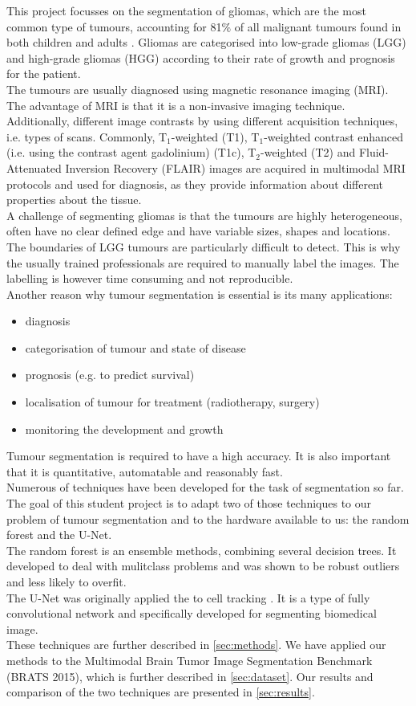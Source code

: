 \documentclass[final]{article}
\begin{document}
This project focusses on the segmentation of gliomas, which are the most common type of tumours, accounting for 81$\%$ of all malignant tumours found in both children and adults \citep{ostrom2014}. Gliomas are categorised into low-grade gliomas (LGG) and high-grade gliomas (HGG) according to their rate of growth and prognosis for the patient.\\
The tumours are usually diagnosed using magnetic resonance imaging (MRI). The advantage of MRI is that it is a non-invasive imaging technique. Additionally, different image contrasts by using different acquisition techniques, i.e. types of scans. Commonly, T$_1$-weighted (T1), T$_1$-weighted contrast enhanced (i.e. using the contrast agent gadolinium) (T1c), T$_2$-weighted (T2) and Fluid-Attenuated Inversion Recovery (FLAIR) images are acquired in multimodal MRI protocols and used for diagnosis, as they provide information about different properties about the tissue.
\\
A challenge of segmenting gliomas is that the tumours are highly heterogeneous, often have no clear defined edge and have variable sizes, shapes and locations. The boundaries of LGG tumours are particularly difficult to detect. This is why the usually trained professionals are required to manually label the images. The labelling is however time consuming and not reproducible.\\
Another reason why tumour segmentation is essential is its many applications:\\
\begin{itemize}
\item diagnosis
\item categorisation of tumour and state of disease
\item prognosis (e.g. to predict survival)
\item localisation of tumour for treatment (radiotherapy, surgery)
\item monitoring the development and growth
\end{itemize}
Tumour segmentation is required to have a high accuracy. It is also important that it is quantitative, automatable and reasonably fast. \\
Numerous of techniques have been developed for the task of segmentation so far. The goal of this student project is to adapt two of those techniques to our problem of tumour segmentation and to the hardware available to us: the random forest and the U-Net.\\
The random forest \citep{ho1995} is an ensemble methods, combining several decision trees. It developed to deal with mulitclass problems and was shown to be robust outliers and less likely to overfit.\\
The U-Net was originally applied the to cell tracking \citep{ronneberger2015u}. It is a type of fully convolutional network and specifically developed for segmenting biomedical image. \\
These techniques are further described in \cref{sec:methods}. We have applied our methods to the Multimodal Brain Tumor Image Segmentation Benchmark (BRATS 2015), which is further described in \cref{sec:dataset}. Our results and comparison of the two techniques are presented in \cref{sec:results}.
\end{document}
